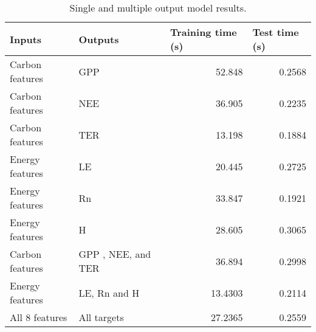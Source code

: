 \begin{table}[htbp]

\caption{Single and multiple output model results.}

\begin{center}

  \begin{tabular}{|l|l|r|r|}

    \hline

    Inputs & Outputs & \multicolumn{1}{l|}{Training time (s)} & \multicolumn{1}{l|}{Test time (s)}  \\ \hline

    Carbon features & GPP & 52.848 & 0.2568  \\ \hline

    Carbon features & NEE & 36.905 & 0.2235  \\ \hline

    Carbon features & TER & 13.198 & 0.1884  \\ \hline

    Energy features & LE & 20.445 & 0.2725  \\ \hline

    Energy features & Rn & 33.847 & 0.1921 \\ \hline

    Energy features & H   & 28.605 & 0.3065  \\ \hline

    Carbon features & GPP , NEE, and TER & 36.894 & 0.2998  \\ \hline

    Energy features & LE, Rn and H  & 13.4303 & 0.2114  \\ \hline
    All 8 features & All targets & 27.2365 & 0.2559  \\ \hline

\end{tabular}

\end{center}

\label{results}

\end{table}

